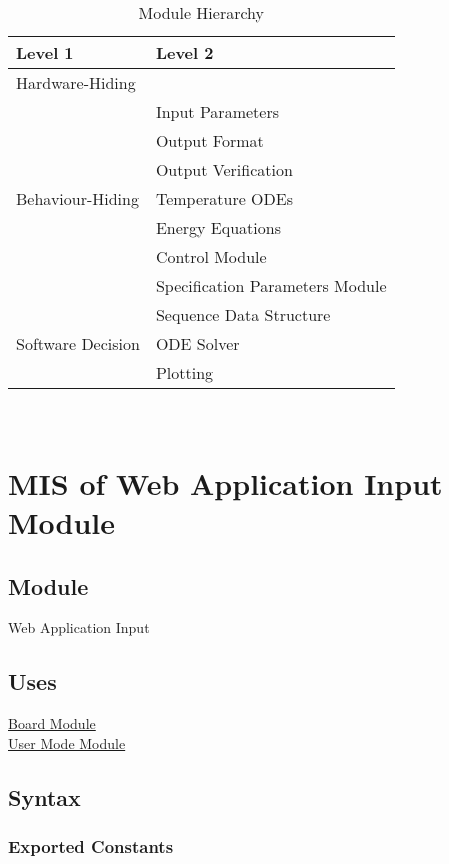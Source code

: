 \documentclass[12pt, titlepage]{article}
\begin{document}
\begin{table}[h!]
\centering
\begin{tabular}{p{} p{}}
\toprule
\textbf{Level 1} & \textbf{Level 2}\\
\midrule

{Hardware-Hiding} & ~ \\
\midrule

\multirow{7}{0.3\textwidth}{Behaviour-Hiding} & Input Parameters\\
& Output Format\\
& Output Verification\\
& Temperature ODEs\\
& Energy Equations\\ 
& Control Module\\
& Specification Parameters Module\\
\midrule

\multirow{3}{0.3\textwidth}{Software Decision} & {Sequence Data Structure}\\
& ODE Solver\\
& Plotting\\
\bottomrule

\end{tabular}
\caption{Module Hierarchy}
\label{TblMH}
\end{table}

\newpage
~\newpage

\section{MIS of Web Application Input Module} \label{mInput}

    \subsection{Module}
    Web Application Input

    \subsection{Uses}
    \hyperref[mBoard]{Board Module}\\
    \hyperref[mMode]{User Mode Module}

    \subsection{Syntax}
    \subsubsection{Exported Constants}
\end{document}

